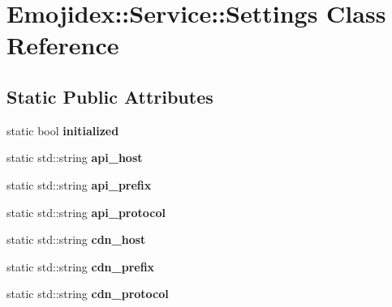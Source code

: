 \hypertarget{classEmojidex_1_1Service_1_1Settings}{}\section{Emojidex\+:\+:Service\+:\+:Settings Class Reference}
\label{classEmojidex_1_1Service_1_1Settings}
\subsection*{Static Public Attributes}
\begin{DoxyCompactItemize}
\item 
static bool {\bfseries initialized}\hypertarget{classEmojidex_1_1Service_1_1Settings_af71baa4b94fd1dabfbcb0fef7e40e551}{}\label{classEmojidex_1_1Service_1_1Settings_af71baa4b94fd1dabfbcb0fef7e40e551}

\item 
static std\+::string {\bfseries api\+\_\+host}\hypertarget{classEmojidex_1_1Service_1_1Settings_a5192b05e10865349f7531e9b48f059d3}{}\label{classEmojidex_1_1Service_1_1Settings_a5192b05e10865349f7531e9b48f059d3}

\item 
static std\+::string {\bfseries api\+\_\+prefix}\hypertarget{classEmojidex_1_1Service_1_1Settings_a91475013a914fb4a5b557a7bb9fa84a6}{}\label{classEmojidex_1_1Service_1_1Settings_a91475013a914fb4a5b557a7bb9fa84a6}

\item 
static std\+::string {\bfseries api\+\_\+protocol}\hypertarget{classEmojidex_1_1Service_1_1Settings_a102c707a10874ba2db39222153d230ef}{}\label{classEmojidex_1_1Service_1_1Settings_a102c707a10874ba2db39222153d230ef}

\item 
static std\+::string {\bfseries cdn\+\_\+host}\hypertarget{classEmojidex_1_1Service_1_1Settings_aafcb2e6bd54ab9773a450282b7e76773}{}\label{classEmojidex_1_1Service_1_1Settings_aafcb2e6bd54ab9773a450282b7e76773}

\item 
static std\+::string {\bfseries cdn\+\_\+prefix}\hypertarget{classEmojidex_1_1Service_1_1Settings_a4540c869e1b27ee4bd9426ea7486c35e}{}\label{classEmojidex_1_1Service_1_1Settings_a4540c869e1b27ee4bd9426ea7486c35e}

\item 
static std\+::string {\bfseries cdn\+\_\+protocol}\hypertarget{classEmojidex_1_1Service_1_1Settings_a007200735113741cec8282054eda7338}{}\label{classEmojidex_1_1Service_1_1Settings_a007200735113741cec8282054eda7338}


\end{DoxyCompactItemize}
